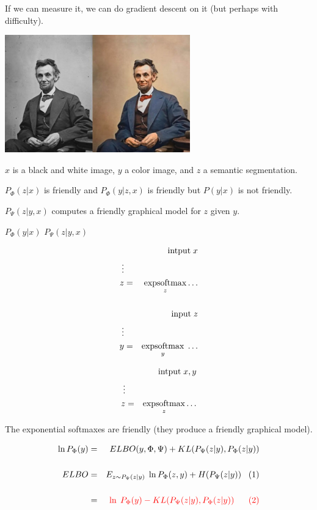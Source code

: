 {\vfill
If we can measure it, we can do gradient descent on it (but perhaps with difficulty).


\centerline{\includegraphics[height = 2in]{../images/Colorization}}

$x$ is a black and white image, $y$ a color image, and $z$ a semantic segmentation.

\vfill
$P_\Phi(z|x)$ is friendly and $P_\Phi(y|z,x)$ is friendly but $P(y|x)$ is not friendly.

\vfill
$P_\Psi(z|y,x)$ computes a friendly graphical model for $z$ given $y$.

\centerline{$P_\Phi(y|x)$ \hspace{10em} $P_\Psi(z|y,x)$}

\vfill
{\huge \color{red}
\parbox{4.0in}{
\begin{eqnarray*}
& & \mbox{intput}\; x \\
\vdots \\
z & = & \operatorname*{expsoftmax}_z \ldots \\
\\
& & \mbox{input}\; z \\
\vdots \\
y & = & \operatorname*{expsoftmax}_y\;\ldots
\end{eqnarray*}
}
\hfill
\parbox{4.0in}{
\begin{eqnarray*}
& & \mbox{intput}\; x,y \\
\vdots \\
z & = & \operatorname*{expsoftmax}_z \ldots \\
\end{eqnarray*}
}
}
\vfill
The exponential softmaxes are friendly (they produce a friendly graphical model).


\begin{eqnarray*}
\ln P_\Phi(y) & = & ELBO(y,\Phi,\Psi) + KL(P_\Psi(z|y),P_\Phi(z|y)) \\
\\
 ELBO & = & E_{z \sim P_\Psi(z|y)}\; \ln P_\Phi(z,y) + H(P_\Psi(z|y))\;\;\;(1) \\
 \\      
  & = &{\color{red} \ln\;P_{\Phi}(y) - KL(P_\Psi(z|y),P_{\Phi}(z|y))\;\;\;\;\;\;(2)}
\end{eqnarray*}

}

